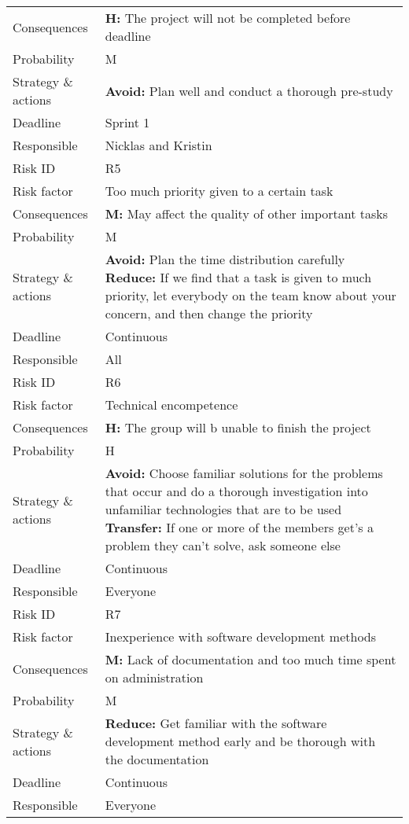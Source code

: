 \documentclass[12pt]{report}
\begin{document}
\begin{table}
\begin{tabularx}{\linewidth}{>{\setlength\hsize{.4\hsize}}X>{\setlength\hsize{0.6\hsize}}X}
Consequences & \textbf{H:} The project will not be completed before deadline \\
Probability & M \\
Strategy \& actions & \textbf{Avoid:} Plan well and conduct a thorough pre-study \\
Deadline & Sprint 1 \\
Responsible & Nicklas and Kristin \\ \hline
Risk ID & R5 \\
Risk factor & Too much priority given to a certain task \\
Consequences & \textbf{M:} May affect the quality of other important tasks \\
Probability & M \\
Strategy \& actions & \textbf{Avoid:} Plan the time distribution carefully \textbf{Reduce:} If we find that a task is given to much priority, let everybody on the team know about your concern, and then change the priority \\
Deadline & Continuous \\
Responsible & All \\ \hline
Risk ID & R6 \\
Risk factor & Technical encompetence \\
Consequences & \textbf{H:} The group will b unable to finish the project \\
Probability & H \\
Strategy \& actions & \textbf{Avoid:} Choose familiar solutions for the problems that occur and do a thorough investigation into unfamiliar technologies that are to be used \textbf{Transfer:} If one or more of the members get's a problem they can't solve, ask someone else \\
Deadline & Continuous \\
Responsible & Everyone \\ \hline
Risk ID & R7 \\
Risk factor & Inexperience with software development methods \\
Consequences & \textbf{M:} Lack of documentation and too much time spent on administration \\
Probability & M \\
Strategy \& actions & \textbf{Reduce:} Get familiar with the software development method early and be thorough with the documentation \\
Deadline & Continuous \\
Responsible & Everyone \\ \hline

\end{tabularx}
\end{table}
\end{document}
